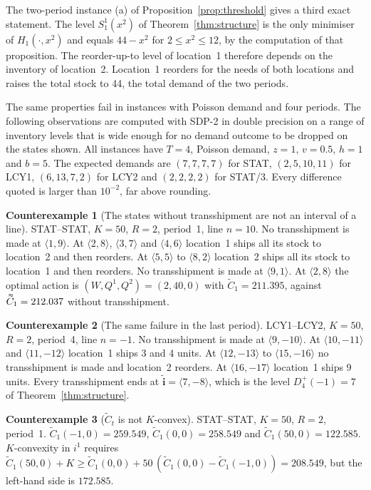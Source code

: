 \documentclass[11pt]{article}
\DeclareRobustCommand{\dbtilde}[1]{\accentset{\approx}{#1}}
\renewcommand{\vec}[1]{\boldsymbol{#1}}
\newcommand{\Ct}{\widetilde{C}}
\newcommand{\Cq}{\dbtilde{C}}
\theoremstyle{definition}
\newtheorem{example}{Counterexample}
\begin{document}
The two-period instance (a) of Proposition~\ref{prop:threshold} gives a third exact statement. The level $S^1_1(x^2)$ of Theorem~\ref{thm:structure} is the only minimiser of $H_1(\cdot,x^2)$ and equals $44-x^2$ for $2\le x^2\le12$, by the computation of that proposition. The reorder-up-to level of location~1 therefore depends on the inventory of location~2. Location~1 reorders for the needs of both locations and raises the total stock to 44, the total demand of the two periods.

The same properties fail in instances with Poisson demand and four periods. The following observations are computed with SDP-2 in double precision on a range of inventory levels that is wide enough for no demand outcome to be dropped on the states shown. All instances have $T=4$, Poisson demand, $z=1$, $v=0.5$, $h=1$ and $b=5$. The expected demands are $(7,7,7,7)$ for STAT, $(2,5,10,11)$ for LCY1, $(6,13,7,2)$ for LCY2 and $(2,2,2,2)$ for STAT/3. Every difference quoted is larger than $10^{-2}$, far above rounding.

\begin{example}[The states without transshipment are not an interval of a line]\label{ex:interval}
STAT--STAT, $K=50$, $R=2$, period~1, line $n=10$. No transshipment is made at $\langle1,9\rangle$. At $\langle2,8\rangle$, $\langle3,7\rangle$ and $\langle4,6\rangle$ location~1 ships all its stock to location~2 and then reorders. At $\langle5,5\rangle$ to $\langle8,2\rangle$ location~2 ships all its stock to location~1 and then reorders. No transshipment is made at $\langle9,1\rangle$. At $\langle2,8\rangle$ the optimal action is $(W,Q^1,Q^2)=(2,40,0)$ with $\Ct_1=211.395$, against $\Cq_1=212.037$ without transshipment.
\end{example}

\begin{example}[The same failure in the last period]\label{ex:last}
LCY1--LCY2, $K=50$, $R=2$, period~4, line $n=-1$. No transshipment is made at $\langle9,-10\rangle$. At $\langle10,-11\rangle$ and $\langle11,-12\rangle$ location~1 ships 3 and 4 units. At $\langle12,-13\rangle$ to $\langle15,-16\rangle$ no transshipment is made and location~2 reorders. At $\langle16,-17\rangle$ location~1 ships 9 units. Every transshipment ends at $\tilde{\vec{i}}=\langle7,-8\rangle$, which is the level $D^+_4(-1)=7$ of Theorem~\ref{thm:structure}.
\end{example}

\begin{example}[$\Ct_t$ is not $K$-convex]\label{ex:kconv}
STAT--STAT, $K=50$, $R=2$, period~1. $\Ct_1(-1,0)=259.549$, $\Ct_1(0,0)=258.549$ and $\Ct_1(50,0)=122.585$. $K$-convexity in $i^1$ requires $\Ct_1(50,0)+K\ge\Ct_1(0,0)+50\,(\Ct_1(0,0)-\Ct_1(-1,0))=208.549$, but the left-hand side is $172.585$.
\end{example}
\end{document}
